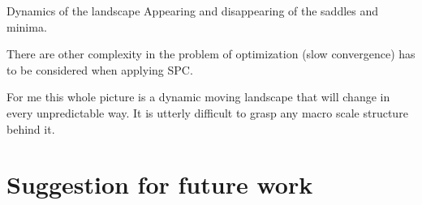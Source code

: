 Dynamics of the landscape
Appearing and disappearing of the saddles and minima. 

There are other complexity in the problem of optimization (slow convergence) has to be considered when applying SPC.

For me this whole picture is a dynamic moving landscape that will change in every unpredictable way. It is utterly difficult to grasp any macro scale structure behind it. 

\section{Suggestion for future work}



